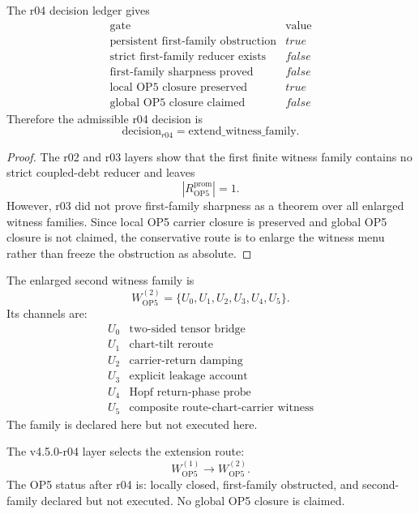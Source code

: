 \begin{proposition}
The r04 decision ledger gives
\[
\begin{array}{c|c}
\text{gate} & \text{value}\\
\hline
\text{persistent first-family obstruction} & true\\
\text{strict first-family reducer exists} & false\\
\text{first-family sharpness proved} & false\\
\text{local OP5 closure preserved} & true\\
\text{global OP5 closure claimed} & false
\end{array}
\]
Therefore the admissible r04 decision is
\[
    \mathrm{decision}_{r04}=\mathrm{extend\_witness\_family}.
\]
\end{proposition}

\begin{proof}
The r02 and r03 layers show that the first finite witness family contains no
strict coupled-debt reducer and leaves
\[
    |R_{\mathrm{OP5}}^{\mathrm{prom}}|=1.
\]
However, r03 did not prove first-family sharpness as a theorem over all
enlarged witness families.  Since local OP5 carrier closure is preserved and
global OP5 closure is not claimed, the conservative route is to enlarge the
witness menu rather than freeze the obstruction as absolute.
\end{proof}

\begin{definition}
The enlarged second witness family is
\[
    W_{\mathrm{OP5}}^{(2)}
    =
    \{U_0,U_1,U_2,U_3,U_4,U_5\}.
\]
Its channels are:
\[
\begin{array}{c|l}
U_0 & \text{two-sided tensor bridge}\\
U_1 & \text{chart-tilt reroute}\\
U_2 & \text{carrier-return damping}\\
U_3 & \text{explicit leakage account}\\
U_4 & \text{Hopf return-phase probe}\\
U_5 & \text{composite route-chart-carrier witness}
\end{array}
\]
The family is declared here but not executed here.
\end{definition}

\begin{theorem}
The v4.5.0-r04 layer selects the extension route:
\[
    W_{\mathrm{OP5}}^{(1)}
    \longrightarrow
    W_{\mathrm{OP5}}^{(2)}.
\]
The OP5 status after r04 is: locally closed, first-family obstructed, and
second-family declared but not executed.  No global OP5 closure is claimed.
\end{theorem}


